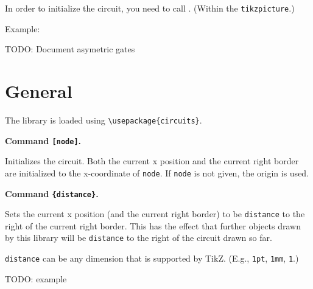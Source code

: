 \documentclass[a4paper]{article}
\makeatletter
\newenvironment{command}[2]{%
  \medskip\noindent\textbf{Command \macroanchor#1\texttt{#2}.} 
}{%
}
\newcommand\nobsstring[1]{{\escapechar=-1\xdef\@tempa{\string#1}}}
\DeclareRobustCommand\macrolink[1]{\nobsstring#1\hyperref[command-\@tempa]{\texttt{\string#1}}}
\DeclareRobustCommand\macroanchor[1]{\nobsstring#1\label{command-\@tempa}\texttt{\string#1}}
\makeatother
\begin{document}
In order to initialize the circuit, you need to call
\macrolink\initializeCircuit. (Within the \verb|tikzpicture|.)

Example:

\begin{example}
\end{example}


TODO: Document asymetric gates

\section{General}

The library is loaded using \verb|\usepackage{circuits}|.

\begin{command}\initializeCircuit{[node]}
  Initializes the circuit. Both the current x position and the current right border are initialized to
  the x-coordinate of \verb|node|. If \texttt{node} is not given, the origin is used.
\end{command}

\begin{command}\stepForward{\{distance\}}
  Sets the current x position (and the current right border) to be
  \texttt{distance} to the right of the current right border. This has
  the effect that further objects drawn by this library will be
  \texttt{distance} to the right of the circuit drawn so far.

  \texttt{distance} can be any dimension that is supported by
  TikZ. (E.g., \texttt{1pt}, \texttt{1mm}, \texttt{1}.)

  TODO: example
\end{command}
\end{document}
